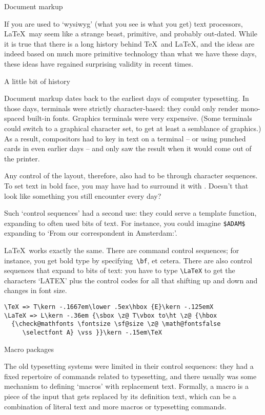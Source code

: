  {Document markup}

If you are used to `wysiwyg' (what you see is what you get) text
processors, \LaTeX\ may seem like a strange beast, primitive, and
probably out-dated. While it is true that there is a long history
behind \TeX\ and \LaTeX, and the ideas are indeed based on much more
primitive technology than what we have these days, these ideas have
regained surprising validity in recent times.

 {A little bit of history}

Document markup dates back to the earliest days of computer
typesetting. In those days, terminals were strictly character-based:
they could only render mono-spaced built-in fonts. Graphics terminals
were very expensive. (Some terminals could switch to a graphical
character set, to get at least a semblance of graphics.) As a result,
compositors had to key in text on a terminal -- or using punched cards
in even earlier days -- and only saw the result
when it would come out of the printer.

Any control of the layout, therefore, also had to be through character
sequences. To set text in bold face, you may have had to surround it
with . Doesn't that look like something you
still encounter every day?

Such `control sequences' had a second use: they could serve a template
function, expanding to often used bits of text. For instance, you
could imagine \verb+$ADAM$+ expanding to `From our correspondent in
Amsterdam:'.

\LaTeX\ works exactly the same. There are command control sequences;
for instance, you get bold type by specifying~{\verb+\bf+}, et cetera.
There are also control sequences that expand to bits of text:
you have to type \verb+\LaTeX+ to get the
characters `LATEX' plus the control codes for all that shifting up and
down and changes in font size.
\begin{verbatim}
\TeX => T\kern -.1667em\lower .5ex\hbox {E}\kern -.125emX
\LaTeX => L\kern -.36em {\sbox \z@ T\vbox to\ht \z@ {\hbox
  {\check@mathfonts \fontsize \sf@size \z@ \math@fontsfalse
     \selectfont A} \vss }}\kern -.15em\TeX 
\end{verbatim}

 {Macro packages}

The old typesetting systems were limited in their control sequences:
they had a fixed repertoire of commands related to typesetting, and
there usually was some mechanism to defining `macros'
with replacement text. Formally, a macro is a piece of the input that
gets replaced by its definition text, which can be a combination of
literal text and more macros or typesetting commands.

